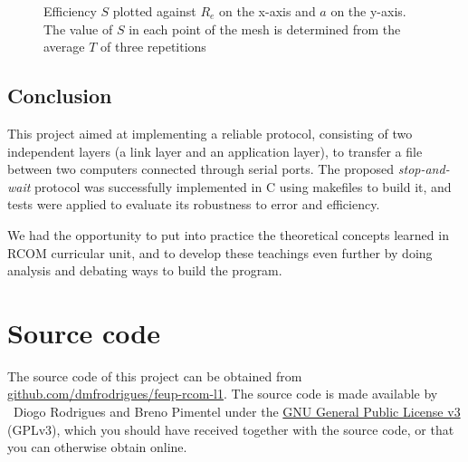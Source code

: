 \documentclass[a4paper, 11pt]{report}
\begin{document}
\begin{figure}[H]
	\begin{center}
	  	\caption{Efficiency $S$ plotted against $R_e$ on the x-axis and $a$ on the y-axis. The value of $S$ in each point of the mesh is determined from the average $T$ of three repetitions} \label{fig:S_aRe}
	\end{center}
\end{figure}

\section{Conclusion} \label{sec:Conclusion}

This project aimed at implementing a reliable protocol, consisting of two independent layers (a link layer and an application layer), to transfer a file between two computers connected through serial ports. The proposed \textit{stop-and-wait} protocol was successfully implemented in C using makefiles to build it, and tests were applied to evaluate its robustness to error and efficiency.

We had the opportunity to put into practice the theoretical concepts learned in RCOM curricular unit, and to develop these teachings even further by doing analysis and debating ways to build the program.

\appendix
\appendixpage
\addappheadtotoc
\chapter{Source code}

The source code of this project can be obtained from \href{https://github.com/dmfrodrigues/feup-rcom-l1}{github.com/dmfrodrigues/feup-rcom-l1}. The source code is made available by \textcopyright~Diogo Rodrigues and Breno Pimentel under the \href{https://www.gnu.org/licenses/gpl-3.0.en.html}{GNU General Public License v3} (GPLv3), which you should have received together with the source code, or that you can otherwise obtain online.
\end{document}
